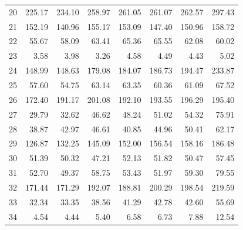 \begin{table}[]
\begin{tabular}{l|rrrrrrr}
		20 & 225.17 & 234.10 & 258.97 & 261.05 & 261.07 & 262.57 & 297.43 \\
		21 & 152.19 & 140.96 & 155.17 & 153.09 & 147.40 & 150.96 & 158.72 \\
		22 & 55.67 & 58.09 & 63.41 & 65.36 & 65.55 & 62.08 & 60.02 \\
		23 & 3.58 & 3.98 & 3.26 & 4.58 & 4.49 & 4.43 & 5.02 \\
		24 & 148.99 & 148.63 & 179.08 & 184.07 & 186.73 & 194.47 & 233.87 \\
		25 & 57.60 & 54.75 & 63.14 & 63.35 & 60.36 & 61.09 & 67.52 \\
		26 & 172.40 & 191.17 & 201.08 & 192.10 & 193.55 & 196.29 & 195.40 \\
		27 & 29.79 & 32.62 & 46.62 & 48.24 & 51.02 & 54.32 & 75.91 \\
		28 & 38.87 & 42.97 & 46.61 & 40.85 & 44.96 & 50.41 & 62.17 \\
		29 & 126.87 & 132.25 & 145.09 & 152.00 & 156.54 & 158.16 & 186.48 \\
		30 & 51.39 & 50.32 & 47.21 & 52.13 & 51.82 & 50.47 & 57.45 \\
		31 & 52.70 & 49.37 & 58.75 & 53.43 & 51.97 & 59.30 & 79.55 \\
		32 & 171.44 & 171.29 & 192.07 & 188.81 & 200.29 & 198.54 & 219.59 \\
		33 & 32.34 & 33.35 & 38.56 & 41.29 & 42.78 & 42.60 & 55.69 \\
		34 & 4.54 & 4.44 & 5.40 & 6.58 & 6.73 & 7.88 & 12.54
	\end{tabular}

\label{tab:Topics_investors_2013-2014}
\end{table}


